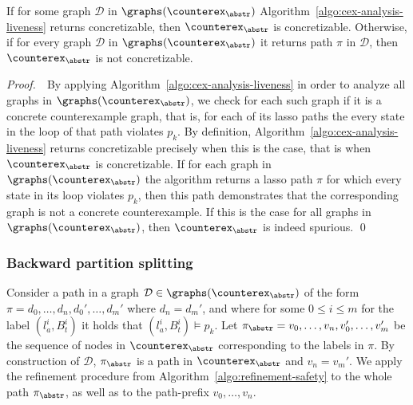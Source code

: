 \bigskip 

\begin{theorem}
If for some graph $\mathcal{D}$ in $\graphs(\counterex_\abstr)$  Algorithm~\ref{algo:cex-analysis-liveness} returns {\sc concretizable}, then $\counterex_\abstr$ is concretizable. Otherwise, if for every graph $\mathcal D$ in $\graphs(\counterex_\abstr)$ it returns path $\pi$ in $\mathcal D$, then $\counterex_\abstr$ is not concretizable.
\end{theorem}
{\it Proof.}\ \ 
By applying Algorithm~\ref{algo:cex-analysis-liveness} in order to analyze all graphs in $\graphs(\counterex_\abstr)$, we check for each such graph if it is a concrete counterexample graph, that is, for each of its lasso paths the every state in the loop of that path violates $p_k$. By definition, Algorithm~\ref{algo:cex-analysis-liveness} returns {\sc concretizable} precisely when this is the case, that is when $\counterex_\abstr$ is concretizable. If for each graph in $\graphs(\counterex_\abstr)$ the algorithm returns a lasso path $\pi$ for which every state in its loop violates $p_k$, then this path demonstrates that the corresponding graph is not a concrete counterexample. If this is the case for all graphs in $\graphs(\counterex_\abstr)$, then $\counterex_\abstr$ is indeed spurious.
\qed

\bigskip 

\subsubsection{Backward partition splitting}

Consider a path in a graph $\mathcal{D}\in\graphs(\counterex_\abstr)$ of the form $\pi = d_0,\ldots, d_n,d_0',\ldots,d_m'$ where $d_n = d_m'$, and where for some $0 \leq i \leq m$ for the label $(l_a^i,B_t^i)$ it holds that $(l_a^i,B_t^i) \models p_k$. Let 
$\pi_\abstr = v_0,\ldots, v_n,v_0',\ldots,v_m'$ be the sequence of nodes in $\counterex_\abstr$ corresponding to the labels in $\pi$. By construction of $\mathcal D$, $\pi_\abstr$ is a path in $\counterex_\abstr$ and $v_n = v_m'$. We apply the refinement procedure from Algorithm~\ref{algo:refinement-safety} to the whole path $\pi_\abstr$, as well as to the path-prefix $v_0,\ldots, v_n$.


